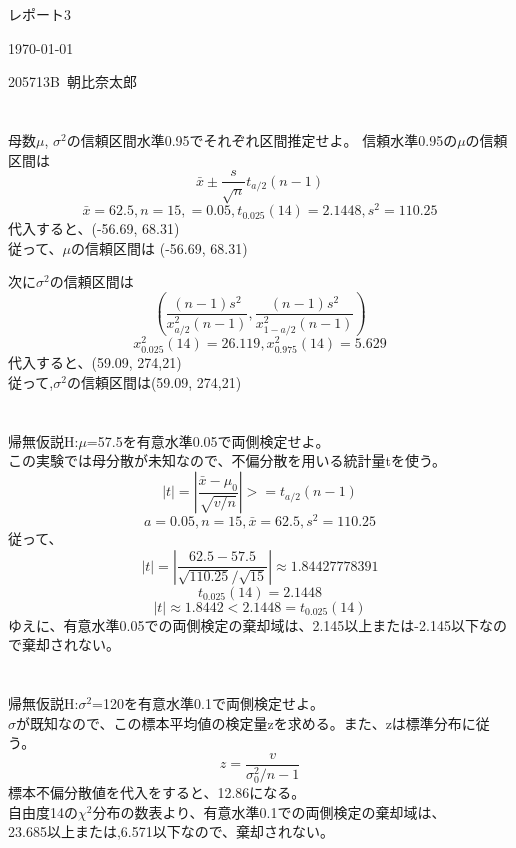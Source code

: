 \documentclass[11pt]{jsarticle}
\begin{document}
レポート3
\begin{flushright}
\today
\end{flushright}
\begin{flushright}
  205713B\ 朝比奈太郎
\end{flushright}
\section{}
母数$\mu $, $\sigma^2$の信頼区間水準0.95でそれぞれ区間推定せよ。
信頼水準0.95の$\mu$の信頼区間は
\[
\bar{x} \pm \frac{s}{\sqrt{n}} t_{a/2}(n-1)
\]
\[
\bar{x} = 62.5, n = 15,  =0.05,
t_{0.025}(14) = 2.1448 , s^2 = 110.25
\]
代入すると、(-56.69, 68.31)\\
従って、$\mu$の信頼区間は (-56.69, 68.31)

次に$\sigma^2$の信頼区間は
\[
(\frac{(n-1)s^2}{x_{a/2}^2(n-1)}, \frac{(n-1)s^2}{x_{1-{a/2}}^2(n-1)})
\]
\[
x^2_{0.025}(14) = 26.119, 
x^2_{0.975}(14) = 5.629
\]
代入すると、(59.09, 274,21)\\
従って,$\sigma^2$の信頼区間は(59.09, 274,21)

\section{}
帰無仮説H:$\mu$=57.5を有意水準0.05で両側検定せよ。\\
この実験では母分散が未知なので、不偏分散を用いる統計量tを使う。
\[
|t| = |\frac{\bar{x}-\mu_0}{\sqrt{v/n}}| >= t_{a/2}(n-1)
\]
\[
a=0.05, n=15, \bar{x}=62.5, s^2=110.25
\]
従って、
\[
|t| = |\frac{62.5-57.5}{\sqrt{110.25}/\sqrt{15}}| \approx 1.84427778391
\]
\[
t_{0.025}(14)= 2.1448 
\]
\[
|t| \approx 1.8442 < 2.1448 = t_{0.025}(14)
\]
ゆえに、有意水準0.05での両側検定の棄却域は、2.145以上または-2.145以下なので棄却されない。

\section{}
帰無仮説H:$\sigma^2$=120を有意水準0.1で両側検定せよ。\\
$\sigma$が既知なので、この標本平均値の検定量zを求める。また、zは標準分布に従う。
\[
z = \frac{v}{\sigma_{0}^2/n-1}
\]
標本不偏分散値を代入をすると、12.86になる。\\
自由度14の$\chi^2$分布の数表より、有意水準0.1での両側検定の棄却域は、\\
23.685以上または,6.571以下なので、棄却されない。
\end{document}
